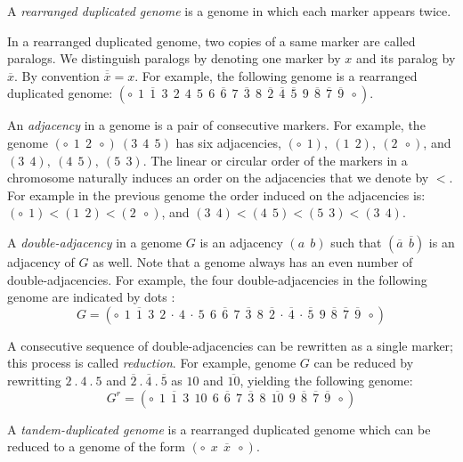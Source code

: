 \documentclass{llncs}
\newcommand{\fst}[1]{ \ensuremath{#1} }
\newcommand{\snd}[1]{ \ensuremath{\overline{#1}} }
\newcommand\aff[2]{\ensuremath{(\fst{#1}~~\fst{#2})}}
\newcommand\ass[2]{\ensuremath{(\snd{#1}~~\snd{#2})}}
\begin{document}
\begin{definition}
A \emph{rearranged duplicated genome} is a genome in which each marker appears 
twice. 
\end{definition}

In a rearranged duplicated genome, two copies of a same marker are called paralogs. We distinguish paralogs by denoting one marker by $\fst{x}$ and its paralog by $\snd{x}$. By convention $\snd{\snd{x}}=x$.
For example, the following genome is a rearranged duplicated genome: 
$(\circ~~\fst{1}~~\snd{1}~~\fst{3}~~\fst{2}~~\fst{4}~~\fst{5}~~\fst{6}~~\snd{6}~~\fst{7}~~\snd{3}~~\fst{8}~~\snd{2}~~\snd{4}~~\snd{5}~~\fst{9}~~\snd{8}~~\snd{7}~~\snd{9}~~\circ )$.


An \emph{adjacency} in a genome is a pair of consecutive markers. 
For example, the genome $(\circ~~\fst{1}~~\fst{2}~~\circ)~ (\fst{3}~~\fst{4}~~\fst{5})$ has six adjacencies, $(\circ ~~\fst{1}),~(\fst{1}~~\fst{2}) ,~ (\fst{2}~~\circ)$, and $(\fst{3}~~\fst{4}) ,~ (\fst{4}~~\fst{5}) ,~ (\fst{5}~~\fst{3})$.
The linear 
or circular order of the markers in a chromosome naturally induces an order 
on the adjacencies that we denote by $<$. For example in the previous genome 
the order induced on the adjacencies is:
 $(\circ ~~\fst{1}) < (\fst{1}~~\fst{2}) < (\fst{2}~~\circ)$, and $(\fst{3}~~\fst{4}) < (\fst{4}~~\fst{5}) < (\fst{5}~~\fst{3}) < (\fst{3}~~\fst{4})$.


A \emph{double-adjacency} in a genome $G$ is an adjacency $\aff{a}{b}$
such that  $\ass{a}{b}$ is an adjacency of $G$ as well. Note that a genome always has an even number of double-adjacencies.
For example, the four double-adjacencies in the following genome are indicated by dots :
$$G = (\circ~~\fst{1}~~\snd{1}~~\fst{3}~~\fst{2}~\cdot~\fst{4}~\cdot~\fst{5}~~\fst{6}~~\snd{6}~~\fst{7}~~\snd{3}~~\fst{8}~~\snd{2}~\cdot~\snd{4}~\cdot~\snd{5}~~\fst{9}~~\snd{8}~~\snd{7}~~\snd{9}~~\circ )$$

A consecutive sequence of double-adjacencies can be rewritten as a single marker; this process is called \emph{reduction}. For example, genome $G$ can be reduced by rewritting $\fst{2}~.~\fst{4}~.~\fst{5}$ and $\snd{2}~.~\snd{4}~.~\snd{5}$ as $\fst{10}$ and $\snd{10}$, yielding the following genome:
$$G^r = (\circ ~~\fst{1}~~\snd{1}~~\fst{3}~~\fst{10}~~\fst{6}~~\snd{6}~~\fst{7}~~\snd{3}~~\fst{8}~~\snd{10}~~\fst{9}~~\snd{8}~~\snd{7}~~\snd{9}~~\circ )$$

\begin{definition}
A \emph{tandem-duplicated genome} is a rearranged duplicated genome which can be reduced to a genome of the form $(\circ~~\fst{x}~~\snd{x}~~\circ )$.
\end{definition}
\end{document}
